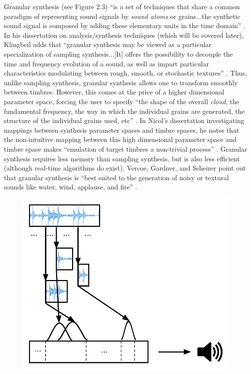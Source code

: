 \documentclass[a4paper,12pt]{report} 	%
\numberwithin{figure}{chapter}
\numberwithin{table}{chapter}
\numberwithin{equation}{chapter}
\begin{document}
\begin{flushleft}
Granular synthesis (see Figure 2.3) ``is a set of techniques that share a common paradigm of representing sound signals by \emph{sound atoms} or grains...the synthetic sound signal is composed by adding these elementary units in the time domain'' \cite[p.13]{Tolonen:1998bh}. In his dissertation on analysis/synthesis techniques (which will be covered later), Klingbeil adds that ``granular synthesis may be viewed as a particular specialization of sampling synthesis...[It] offers the possibility to decouple the time and frequency evolution of a sound, as well as impart particular characteristics modulating between rough, smooth, or stochastic textures'' \cite[p. 6]{Klingbeil:2009lo}. Thus, unlike sampling synthesis, granular synthesis allows one to transform smoothly between timbres. However, this comes at the price of a higher dimensional parameter space, forcing the user to specify ``the shape of the overall \emph{cloud}, the fundamental frequency, the way in which the individual grains are generated, the structure of the individual grains used, etc'' \cite[p. 5]{Johnson:1998sh}. In Nicol's dissertation investigating mappings between synthesis parameter spaces and timbre spaces, he notes that the non-intuitive mapping between this high dimensional parameter space and timbre space makes ``emulation of target timbres a non-trivial process'' \cite[p. 49]{Nicol:2005rp}. Granular synthesis requires less memory than sampling synthesis, but is also less efficient (although real-time algorithms do exist). Vercoe, Gardner, and Scheirer point out that granular synthesis is ``best suited to the generation of noisy or textural sounds like water, wind, applause, and fire'' \cite[p. 6]{Vercoe:1998hh}.
\\
\begin{figure}[h!]
\begin{center}
\includegraphics[scale=0.8]{GranularSynthesis}

\end{center}
\end{figure}
\end{flushleft}
\end{document}
